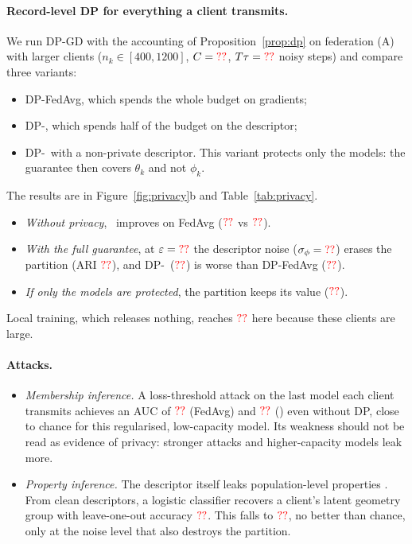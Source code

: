 \paragraph{Record-level DP for everything a client transmits.}
We run DP-GD with the accounting of Proposition~\ref{prop:dp} on federation (A) with larger
clients ($n_k\in[400,1200]$, $C=\textcolor{red}{??}$, $T\tau=\textcolor{red}{??}$ noisy steps) and compare three
variants:
\begin{itemize}[leftmargin=1.2em,itemsep=2pt]
  \item DP-FedAvg, which spends the whole budget on gradients;
  \item DP-\ptopofl, which spends half of the budget on the descriptor;
  \item DP-\ptopofl\ with a non-private descriptor. This variant protects only the
    models: the guarantee then covers $\theta_k$ and not $\phi_k$.
\end{itemize}
The results are in Figure~\ref{fig:privacy}b and Table~\ref{tab:privacy}.
\begin{itemize}[leftmargin=1.2em,itemsep=2pt]
  \item \emph{Without privacy}, \ptopofl\ improves on FedAvg ($\textcolor{red}{??}$ vs
    $\textcolor{red}{??}$).
  \item \emph{With the full guarantee}, at $\varepsilon=\textcolor{red}{??}$ the descriptor noise
    ($\sigma_\phi=\textcolor{red}{??}$) erases the partition (ARI $\textcolor{red}{??}$), and DP-\ptopofl\
    ($\textcolor{red}{??}$) is worse than DP-FedAvg ($\textcolor{red}{??}$).
  \item \emph{If only the models are protected}, the partition keeps its value
    ($\textcolor{red}{??}$).
\end{itemize}
Local training, which releases nothing, reaches $\textcolor{red}{??}$ here because these clients are
large.

\paragraph{Attacks.}
\begin{itemize}[leftmargin=1.2em,itemsep=2pt]
  \item \emph{Membership inference.} A loss-threshold attack \citep{yeom2018privacy} on the
    last model each client transmits achieves an AUC of $\textcolor{red}{??}$ (FedAvg) and
    $\textcolor{red}{??}$ (\ptopofl) even without DP, close to chance for this regularised,
    low-capacity model. Its weakness should not be read as evidence of privacy: stronger
    attacks and higher-capacity models leak more.
  \item \emph{Property inference.} The descriptor itself leaks population-level properties
    \citep{melis2019exploiting}. From clean descriptors, a logistic classifier recovers a
    client's latent geometry group with leave-one-out accuracy $\textcolor{red}{??}$. This falls to
    $\textcolor{red}{??}$, no better than chance, only at the noise level that also destroys the
    partition.
\end{itemize}

